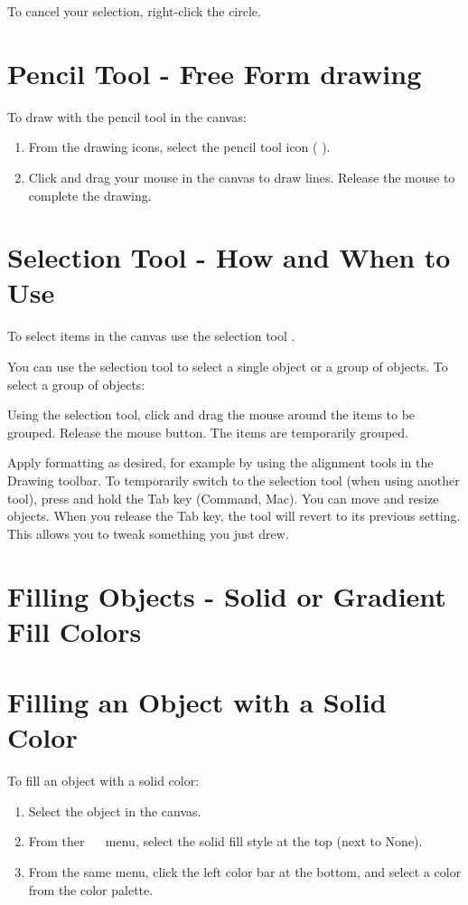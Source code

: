 To cancel your selection, right-click the circle.

\section{Pencil Tool - Free Form drawing}
To draw with the pencil tool in the canvas:

\begin{enumerate}
  \item From the drawing icons, select the pencil tool icon ( ).

  \item Click and drag your mouse in the canvas to draw lines. Release the mouse to complete the drawing.

\end{enumerate}

\section{Selection Tool - How and When to Use}
To select items in the canvas use the selection tool .

You can use the selection tool to select a single object or a group of objects. To select a group of objects:

Using the selection tool, click and drag the mouse around the items to be grouped. Release the mouse button. The items are temporarily grouped.

Apply formatting as desired, for example by using the alignment tools in the Drawing toolbar. To temporarily switch to the selection tool (when using another tool), press and hold the Tab key (Command, Mac). You can move and resize objects. When you release the Tab key, the tool will revert to its previous setting. This allows you to tweak something you just drew.

\section{Filling Objects - Solid or Gradient Fill Colors}
\section{Filling an Object with a Solid Color}
To fill an object with a solid color:

\begin{enumerate}
  \item Select the object in the canvas.

  \item From ther $\quad$ menu, select the solid fill style at the top (next to None).

  \item From the same menu, click the left color bar at the bottom, and select a color from the color palette.

\end{enumerate}

